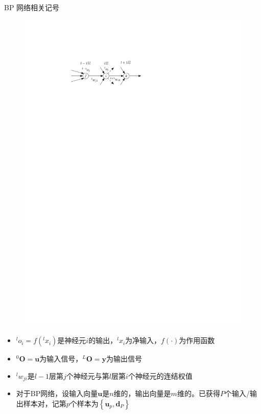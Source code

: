 \begin{note}
    BP 网络相关记号
    \begin{figure}[htbp]
        \centering
        \includegraphics{image/BP网络相关记号.pdf}
    \end{figure}
    \begin{itemize}
        \item $^{l}o_{i} = f(^{l}x_i)$是神经元$i$的输出，$^{l}x_{i}$为净输入，$f(\cdot)$为作用函数
        \item $^{0}\boldsymbol{O} = \boldsymbol{u}$为输入信号，$^{L}\boldsymbol{O} = \boldsymbol{y}$为输出信号
        \item $^{l}w_{ji}$是$l-1$层第$j$个神经元与第$l$层第$i$个神经元的连结权值
        \item 对于BP网络，设输入向量$\boldsymbol{u}$是$n$维的，输出向量是$m$维的。已获得$P$个输入/输出样本对，记第$p$个样本为$\left\{ \boldsymbol{u}_p,\boldsymbol{d}_P \right\}$
    \end{itemize}
\end{note}

